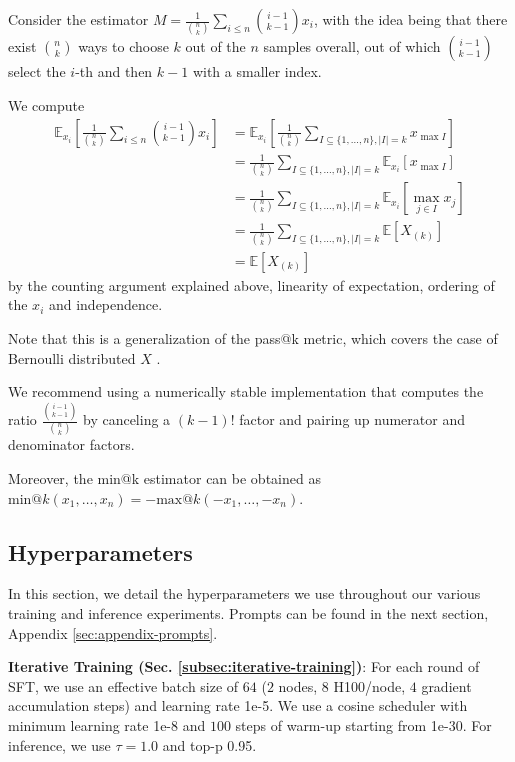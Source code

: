 Consider the estimator $
M = \frac{1}{\binom{n}{k}}\sum_{i \leq n} \binom{i-1}{k-1} x_i$,
with the idea being that there exist $\binom{n}{k}$ ways to choose $k$ out of the $n$ samples overall, out of which $\binom{i-1}{k-1}$ select the $i$-th and then $k-1$ with a smaller index.

We compute
\begin{align*}
\mathbb{E}_{x_i}\left[\frac{1}{\binom{n}{k}}\sum_{i \leq n} \binom{i-1}{k-1} x_i\right]
&= \mathbb{E}_{x_i}\left[ \frac{1}{\binom{n}{k}} \sum_{I \subseteq \{1, \ldots, n\}, |I| = k} x_{\max I} \right]  \\
&= \frac{1}{\binom{n}{k}} \sum_{I \subseteq \{1, \ldots, n\}, |I| = k} \mathbb{E}_{x_i}\left[ x_{\max I} \right]  \\
&= \frac{1}{\binom{n}{k}} \sum_{I \subseteq \{1, \ldots, n\}, |I| = k} \mathbb{E}_{x_i}\left[ \max_{j \in I} x_j \right] \\
&= \frac{1}{\binom{n}{k}} \sum_{I \subseteq \{1, \ldots, n\}, |I| = k} \mathbb{E} \left[ X_{(k)} \right] \\
&= \mathbb{E}\left[ X_{(k)} \right] 
\end{align*}
by the counting argument explained above, linearity of expectation, ordering of the $x_i$ and independence. 

Note that this is a generalization of the pass@k metric, which covers the case of Bernoulli distributed  $X$ \citep{chen2021evaluatinglargelanguagemodels}.

We recommend using a numerically stable implementation that computes the ratio $\frac{\binom{i-1}{k-1}}{\binom{n}{k}}$ by canceling a $(k-1)!$ factor and pairing up numerator and denominator factors.

Moreover, the min@k estimator can be obtained as $\text{min@}k(x_1, \ldots, x_n) = -\text{max@}k(-x_1, \ldots, -x_n)$.
\vfill


\newpage
\subsection{Hyperparameters}

In this section, we detail the hyperparameters we use throughout our various training and inference experiments. Prompts can be found in the next section, Appendix \ref{sec:appendix-prompts}.

\textbf{Iterative Training (Sec. \ref{subsec:iterative-training})}: For each round of SFT, we use an effective batch size of $64$ ($2$ nodes, $8$ H100/node, $4$ gradient accumulation steps) and learning rate 1e-5. We use a cosine scheduler with minimum learning rate 1e-8 and $100$ steps of warm-up starting from 1e-30. For inference, we use $\tau=1.0$ and top-p 0.95.

